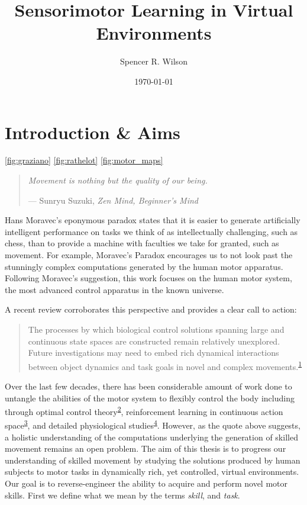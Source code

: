 \documentclass[
  a4paper,
]{article}
\title{Sensorimotor Learning in Virtual Environments}
\author{Spencer R. Wilson}
\date{\today}
\begin{document}
\maketitle

\hypertarget{sec:intro}{%
\section{Introduction \& Aims}\label{sec:intro}}

\cref{fig:graziano} \cref{fig:rathelot} \cref{fig:motor_maps}

\begin{quote}
\emph{Movement is nothing but the quality of our being.}

--- Sunryu Suzuki, \emph{Zen Mind, Beginner's Mind}
\end{quote}

Hans Moravec's eponymous paradox states that it is easier to generate
artificially intelligent performance on tasks we think of as
intellectually challenging, such as chess, than to provide a machine
with faculties we take for granted, such as movement. For example,
Moravec's Paradox encourages us to not look past the stunningly complex
computations generated by the human motor apparatus. Following Moravec's
suggestion, this work focuses on the human motor system, the most
advanced control apparatus in the known universe.

A recent review corroborates this perspective and provides a clear call
to action:

\begin{quote}
The processes by which biological control solutions spanning large and
continuous state spaces are constructed remain relatively unexplored.
Future investigations may need to embed rich dynamical interactions
between object dynamics and task goals in novel and complex
movements.\textsuperscript{\protect\hyperlink{ref-McNamee2019}{1}}
\end{quote}

Over the last few decades, there has been considerable amount of work
done to untangle the abilities of the motor system to flexibly control
the body including through optimal control
theory\textsuperscript{\protect\hyperlink{ref-Todorov2004}{2}},
reinforcement learning in continuous action
space\textsuperscript{\protect\hyperlink{ref-koberReinforcementLearningRobotics2013}{3}},
and detailed physiological
studies\textsuperscript{\protect\hyperlink{ref-sauerbreiCorticalPatternGeneration2019}{4}}.
However, as the quote above suggests, a holistic understanding of the
computations underlying the generation of skilled movement remains an
open problem. The aim of this thesis is to progress our understanding of
skilled movement by studying the solutions produced by human subjects to
motor tasks in dynamically rich, yet controlled, virtual environments.
Our goal is to reverse-engineer the ability to acquire and perform novel
motor skills. First we define what we mean by the terms \emph{skill},
and \emph{task}.
\end{document}
